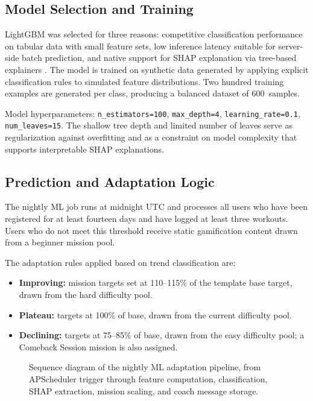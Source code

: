 \documentclass[12pt, a4paper]{report}
\begin{document}
\subsection{Model Selection and Training}

LightGBM was selected for three reasons: competitive classification performance on tabular data with small feature sets, low inference latency suitable for server-side batch prediction, and native support for SHAP explanation via tree-based explainers \citep{ke2017, lundberg2017}. The model is trained on synthetic data generated by applying explicit classification rules to simulated feature distributions. Two hundred training examples are generated per class, producing a balanced dataset of 600~samples.

Model hyperparameters: \texttt{n\_estimators=100}, \texttt{max\_depth=4}, \texttt{learning\_rate=0.1}, \texttt{num\_leaves=15}. The shallow tree depth and limited number of leaves serve as regularization against overfitting and as a constraint on model complexity that supports interpretable SHAP explanations.

\subsection{Prediction and Adaptation Logic}

The nightly ML job runs at midnight UTC and processes all users who have been registered for at least fourteen days and have logged at least three workouts. Users who do not meet this threshold receive static gamification content drawn from a beginner mission pool.

The adaptation rules applied based on trend classification are:
\begin{itemize}
  \item \textbf{Improving:} mission targets set at 110--115\% of the template base target, drawn from the hard difficulty pool.
  \item \textbf{Plateau:} targets at 100\% of base, drawn from the current difficulty pool.
  \item \textbf{Declining:} targets at 75--85\% of base, drawn from the easy difficulty pool; a Comeback Session mission is also assigned.
\end{itemize}

\begin{figure}[H]
  \centering
  \caption{Sequence diagram of the nightly ML adaptation pipeline, from APScheduler trigger through feature computation, classification, SHAP extraction, mission scaling, and coach message storage.}
  \label{fig:seq-ml}
\end{figure}
\end{document}
